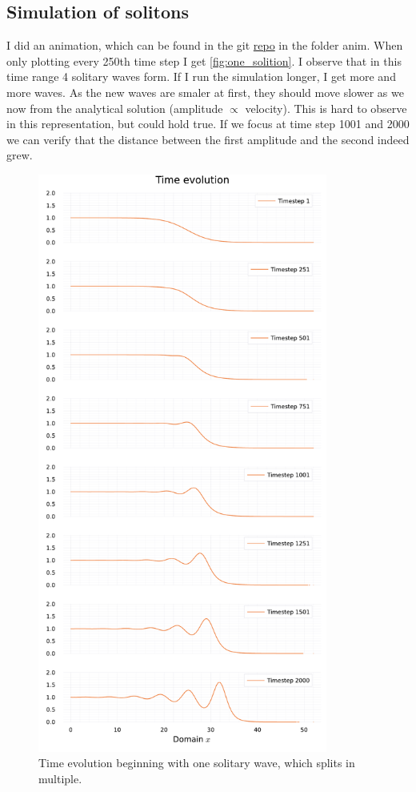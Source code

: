 \documentclass[
	a4paper, %
	10pt, %
]{CSUniSchoolLabReport}
\begin{document}
\subsection{Simulation of solitons}

I did an animation, which can be found in the git \href{https://github.com/simonblaue/MCP-Ex4.git}{repo} in the folder anim. When only plotting every 250th time step I get \autoref{fig:one_solition}. I observe that in this time range 4 solitary waves form. If I run the simulation longer, I get more and more waves. As the new waves are smaler at first, they should move slower as we now from the analytical solution (amplitude $\propto$ velocity). This is hard to observe in this representation, but could hold true. If we focus at time step 1001 and 2000 we can verify that the distance between the first amplitude and the second indeed grew.

\begin{figure}
	\centering
	\includegraphics[width=0.85\textwidth]{../saves_t3/one_soliton.pdf}
	\caption{Time evolution beginning with one solitary wave, which splits in multiple.}
	\label{fig:one_solition}
\end{figure}
\end{document}
